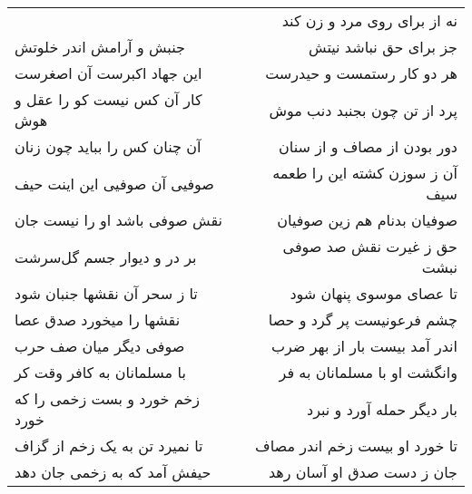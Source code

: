 \begin{center}
\begin{longtable}{l p{0.5cm} r}
&&
نه از برای روی مرد و زن کند
\\
جنبش و آرامش اندر خلوتش
&&
جز برای حق نباشد نیتش
\\
این جهاد اکبرست آن اصغرست
&&
هر دو کار رستمست و حیدرست
\\
کار آن کس نیست کو را عقل و هوش
&&
پرد از تن چون بجنبد دنب موش
\\
آن چنان کس را بباید چون زنان
&&
دور بودن از مصاف و از سنان
\\
صوفیی آن صوفیی این اینت حیف
&&
آن ز سوزن کشته این را طعمه سیف
\\
نقش صوفی باشد او را نیست جان
&&
صوفیان بدنام هم زین صوفیان
\\
بر در و دیوار جسم گل‌سرشت
&&
حق ز غیرت نقش صد صوفی نبشت
\\
تا ز سحر آن نقشها جنبان شود
&&
تا عصای موسوی پنهان شود
\\
نقشها را میخورد صدق عصا
&&
چشم فرعونیست پر گرد و حصا
\\
صوفی دیگر میان صف حرب
&&
اندر آمد بیست بار از بهر ضرب
\\
با مسلمانان به کافر وقت کر
&&
وانگشت او با مسلمانان به فر
\\
زخم خورد و بست زخمی را که خورد
&&
بار دیگر حمله آورد و نبرد
\\
تا نمیرد تن به یک زخم از گزاف
&&
تا خورد او بیست زخم اندر مصاف
\\
حیفش آمد که به زخمی جان دهد
&&
جان ز دست صدق او آسان رهد
\\
\end{longtable}
\end{center}
